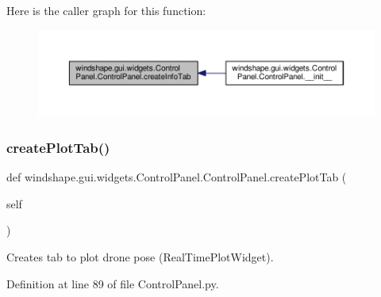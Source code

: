 Here is the caller graph for this function\+:\nopagebreak
\begin{figure}[H]
\begin{center}
\leavevmode
\includegraphics[width=350pt]{classwindshape_1_1gui_1_1widgets_1_1_control_panel_1_1_control_panel_af7ffe8727031aa36ee612fe6b2e44e8f_icgraph}
\end{center}
\end{figure}
\mbox{\label{classwindshape_1_1gui_1_1widgets_1_1_control_panel_1_1_control_panel_a399541328b581ef0ba6a56fa7309b3d4}} 
\subsubsection{\texorpdfstring{create\+Plot\+Tab()}{createPlotTab()}}
{\footnotesize\ttfamily def windshape.\+gui.\+widgets.\+Control\+Panel.\+Control\+Panel.\+create\+Plot\+Tab (\begin{DoxyParamCaption}\item[{}]{self }\end{DoxyParamCaption})}

\begin{DoxyVerb}Creates tab to plot drone pose (RealTimePlotWidget).\end{DoxyVerb}
 

Definition at line 89 of file Control\+Panel.\+py.

